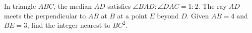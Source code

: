 In triangle $ABC$, the median $AD$ satisfies $\angle BAD:\angle DAC=1:2$. The ray $AD$ meets the perpendicular to $AB$ at $B$ at a point $E$ beyond $D$. Given $AB=4$ and $BE=3$, find the integer nearest to $BC^2$.
